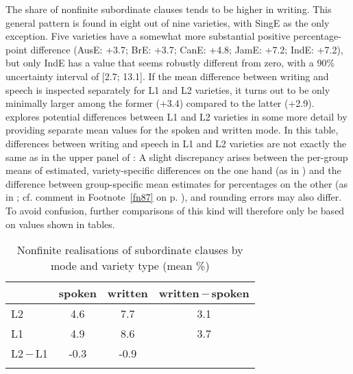 The share of nonfinite subordinate clauses tends to be higher in writing. This general pattern is found in eight out of nine varieties, with SingE as the only exception. Five varieties have a somewhat more substantial positive percentage-point difference (AusE: +3.7; BrE: +3.7; CanE: +4.8; JamE: +7.2; IndE: +7.2), but only IndE has a value that seems robustly different from zero, with a 90\% uncertainty interval of [2.7; 13.1]. If the mean difference between writing and speech is inspected separately for L1 and L2 varieties, it turns out to be only minimally larger among the former (+3.4) compared to the latter (+2.9).  explores potential differences between L1 and L2 varieties in some more detail by providing separate mean values for the spoken and written mode. In this table, differences between writing and speech in L1 and L2 varieties are not exactly the same as in the upper panel of : A slight discrepancy arises between the per-group means of estimated, variety-specific differences on the one hand (as in ) and the difference between group-specific mean estimates for percentages on the other (as in ; cf. comment in Footnote~\ref{fn87} on p. \pageref{fn87}), and rounding errors may also differ. To avoid confusion, further comparisons of this kind will therefore only be based on values shown in tables.

\begin{table}
\caption{\label{bkm:Ref75787839}\label{tab:11.1}Nonfinite realisations of subordinate clauses by mode and variety type (mean \%)}
\begin{tabular}{l *3{S[table-format=-1.1]}}
\lsptoprule
 & {spoken} & {written} & {written\,$-$\,spoken}\\\midrule
L2      & 4.6  & 7.7 & 3.1\\
L1      & 4.9  & 8.6 & 3.7\\
L2\,$-$\,L1   & -0.3 & -0.9 & \\
\lspbottomrule
\end{tabular}
\end{table}

